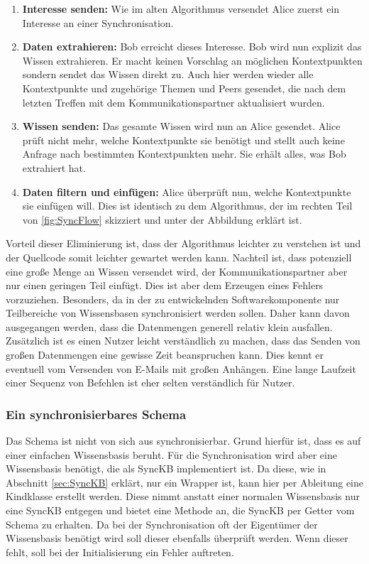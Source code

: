 \documentclass[a4paper]{article}
\begin{document}
	\begin{enumerate}
		\item \textbf{Interesse senden:} Wie im alten Algorithmus versendet Alice
		zuerst ein Interesse an einer Synchronisation.
		\item \textbf{Daten extrahieren:} Bob erreicht dieses Interesse. Bob
		wird nun explizit das Wissen extrahieren. Er macht keinen Vorschlag an
		möglichen Kontextpunkten sondern sendet das Wissen direkt zu. Auch
		hier werden wieder alle Kontextpunkte und zugehörige Themen und Peers
		gesendet, die nach dem letzten Treffen mit dem Kommunikationspartner
		aktualisiert wurden.
		\item \textbf{Wissen senden:} Das gesamte Wissen wird nun an Alice gesendet.
		Alice prüft nicht mehr, welche Kontextpunkte sie benötigt und stellt auch
		keine Anfrage nach bestimmten Kontextpunkten mehr. Sie erhält alles, was
		Bob extrahiert hat.
		\item \textbf{Daten filtern und einfügen:} Alice überprüft nun, welche
		Kontextpunkte sie einfügen will. Dies ist identisch zu dem Algorithmus,
		der im rechten Teil von \autoref{fig:SyncFlow} skizziert und unter der
		Abbildung erklärt ist.
	\end{enumerate} 	
		
	Vorteil dieser Eliminierung ist, dass der Algorithmus leichter zu verstehen ist 
	und	der Quellcode somit leichter gewartet werden kann. Nachteil ist, dass
	potenziell eine große Menge an Wissen versendet wird, der 
	Kommunikationspartner aber nur einen geringen Teil einfügt. Dies ist aber
	dem Erzeugen eines Fehlers vorzuziehen. Besonders, da in der zu entwickelnden
	Softwarekomponente nur Teilbereiche von Wissensbasen synchronisiert werden
	sollen. Daher kann davon ausgegangen werden, dass die Datenmengen generell
	relativ klein ausfallen. Zusätzlich ist es einen Nutzer leicht verständlich zu
	machen, dass das Senden von großen Datenmengen eine gewisse Zeit beanspruchen
	kann. Dies kennt er eventuell vom Versenden von E-Mails mit großen Anhängen.
	Eine lange Laufzeit einer Sequenz von Befehlen ist eher selten verständlich für
	Nutzer.	 
	
	\subsubsection{Ein synchronisierbares Schema}
	
	Das Schema ist nicht von sich aus synchronisierbar. Grund hierfür ist, dass es
	auf einer einfachen Wissensbasis beruht. Für die Synchronisation wird aber
	eine Wissensbasis benötigt, die als SyncKB implementiert ist. Da diese,
	wie in Abschnitt \ref{sec:SyncKB} erklärt, nur ein Wrapper ist, kann hier per
	Ableitung  eine	Kindklasse erstellt werden. Diese nimmt anstatt einer normalen
	Wissensbasis nur eine SyncKB entgegen und bietet eine Methode an, die SyncKB per
	Getter vom Schema zu erhalten. Da bei der Synchronisation oft der Eigentümer
	der Wissensbasis benötigt wird soll dieser ebenfalls überprüft werden. Wenn
	dieser fehlt, soll bei der Initialisierung ein Fehler auftreten. \\
	
\end{document}

